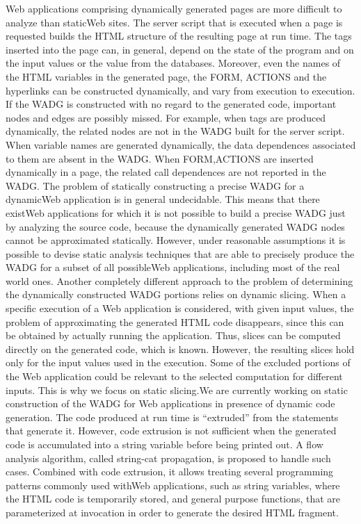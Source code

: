 \documentclass[11pt]{article}   %
\begin{document}
\par Web applications comprising dynamically generated pages are  more difficult
to analyze than staticWeb sites. The server script that is executed when a page is requested
builds the HTML structure of the resulting page at run time. The tags inserted into the
page can, in general, depend on the state of the program and on the input values or the value from the databases. Moreover, even the names of the HTML variables in the generated page, the FORM, ACTIONS and
the hyperlinks can be constructed dynamically, and vary from execution to execution. If
the WADG is constructed with no regard to the generated code, important nodes and edges
are possibly missed. For example, when tags are produced dynamically, the related nodes
are not in the WADG built for the server script. When variable names are generated dynamically,
the data dependences associated to them are absent in the WADG. When FORM,ACTIONS
are inserted dynamically in a page, the related call dependences are not reported in the WADG.
The problem of statically constructing a precise WADG for a dynamicWeb application is in
general undecidable. This means that there existWeb applications for which it is not possible
to build a precise WADG just by analyzing the source code, because the dynamically generated
WADG nodes cannot be approximated statically. However, under reasonable assumptions it
is possible to devise static analysis techniques that are able to precisely produce the WADG
for a subset of all possibleWeb applications, including most of the real world ones. 
Another completely different approach to the problem of determining the dynamically
constructed WADG portions relies on dynamic slicing. When a specific execution of a Web
application is considered, with given input values, the problem of approximating the generated
HTML code disappears, since this can be obtained by actually running the application.
Thus, slices can be computed directly on the generated code, which is known. However, the
resulting slices hold only for the input values used in the execution. Some of the excluded
portions of the Web application could be relevant to the selected computation for different
inputs. This is why we focus on static slicing.We are currently working on static construction of the WADG for Web
applications in presence of dynamic code generation. The code produced at run time is
“extruded” from the statements that generate it. However, code extrusion is not sufficient
when the generated code is accumulated into a string variable before being printed out. A
flow analysis algorithm, called string-cat propagation, is proposed to handle such cases.
Combined with code extrusion, it allows treating several programming patterns commonly
used withWeb applications, such as string variables, where the HTML code is temporarily
stored, and general purpose functions, that are parameterized at invocation in order to
generate the desired HTML fragment.
\end{document}
